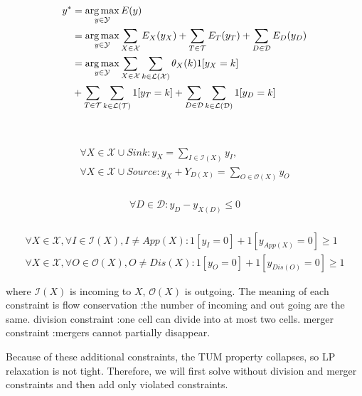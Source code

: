 \documentclass[10pt,twocolumn,letterpaper]{article}
\begin{document}
\begin{scriptsize}
\begin{align}
  y^{*} &= \operatorname*{arg\,max}_{y\in\mathcal{Y}} E(y) \\ 
     &= \operatorname*{arg\,max}_{y\in\mathcal{Y}} \sum\limits_{X\in\mathcal{X}} E_X(y_X) + \sum\limits_{T\in\mathcal{T}} E_T(y_T) + \sum\limits_{D\in\mathcal{D}} E_D(y_D) \\
     &= \operatorname*{arg\,max}_{y\in\mathcal{Y}} \sum\limits_{X\in\mathcal{X}} \sum\limits_{k\in\mathcal{L(X)}} \theta_X(k) 1[y_X = k] \\
     & + \sum\limits_{T\in\mathcal{T}} \sum\limits_{k\in\mathcal{L(T)}} 1[y_T = k] \newline + \sum\limits_{D\in\mathcal{D}} \sum\limits_{k\in\mathcal{L(D)}} 1[y_D = k]
\end{align}
 \\
 \\
\begin{align}
\forall X\in\mathcal{X} \cup Sink : y_{X} = \sum\limits_{I\in\mathcal{I}(X)}y_{I}, \\
\forall X\in\mathcal{X} \cup Source : y_{X} + Y_{D(X)} = \sum\limits_{O\in\mathcal{O}(X)}y_{O}
\end{align}
 \\
\begin{align}
\forall D\in\mathcal{D} : y_{D} - y_{X(D)} \leq 0
\end{align}
 \\
\begin{align}
\forall X\in\mathcal{X}, \forall I\in\mathcal{I}(X),I \neq App(X) : 1[y_{I}=0]+1[y_{App(X)}=0] \geq 1 \\
\forall X\in\mathcal{X}, \forall O\in\mathcal{O}(X),O \neq Dis(X) : 1[y_{O}=0]+1[y_{Dis(O)}=0] \geq 1
\end{align}
\end{scriptsize}

where $\mathcal{I}(X)$ is incoming to $X$, $\mathcal{O}(X)$ is outgoing. The meaning of each constraint is
flow conservation :the number of incoming and out going are the same.
division constraint :one cell can divide into at most two cells.
merger constraint :mergers cannot partially disappear.

Because of these additional constraints, the TUM property collapses, so LP relaxation is not tight.
Therefore, we will first solve without division and merger constraints and then add only violated constraints.
\end{document}
